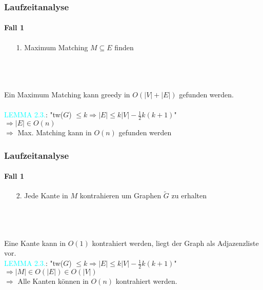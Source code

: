 
\begin{frame}
\frametitle{Laufzeitanalyse}
\framesubtitle{Fall 1}

\begin{enumerate}
	\item[1.] Maximum Matching $M \subseteq E$ finden
\end{enumerate}
\ \\
\ \\
\ \\
Ein Maximum Matching kann greedy in $O(|V|+|E|)$ gefunden werden. \\
\ \\
\textcolor{cyan}{LEMMA 2.3.}: "tw($G$) $\leq k \Rightarrow |E| \leq k|V| - \frac{1}{2} k (k+1)$" \\
$\Rightarrow |E| \in O(n)$ \\
$\Rightarrow$ Max. Matching kann in $O(n)$ gefunden werden
\end{frame}


\begin{frame}
\frametitle{Laufzeitanalyse}
\framesubtitle{Fall 1}

\begin{enumerate}
	\item[2.] Jede Kante in $M$ kontrahieren um Graphen $\widetilde{G}$ zu erhalten
\end{enumerate}
\ \\
\ \\
\ \\
Eine Kante kann in $O(1)$ kontrahiert werden, liegt der Graph als Adjazenzliste vor.
\ \\
\textcolor{cyan}{LEMMA 2.3.}: "tw($G$) $\leq k \Rightarrow |E| \leq k|V| - \frac{1}{2} k (k+1)$" \\
$\Rightarrow |M| \in O(|E|) \in O(|V|)$ \\
$\Rightarrow$ Alle Kanten können in $O(n)$ kontrahiert werden.
\end{frame}



